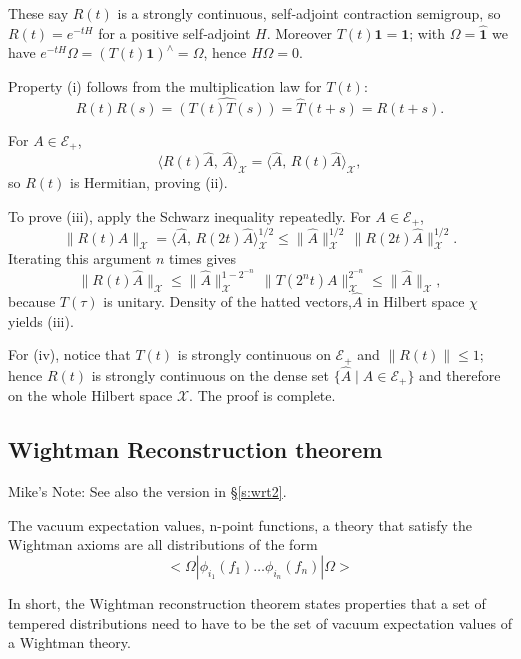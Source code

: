 \documentclass{article}
\newcommand{\1}{\mathbbm{1}}
\theoremstyle{plain}
\theoremstyle{definition}
\numberwithin{equation}{section}
\newcommand\MRD[1]{{\color{red} Mike's Note: #1}}
\begin{document}
These say \(R(t)\) is a strongly continuous, self‑adjoint contraction
semigroup, so \(R(t)=e^{-tH}\) for a positive self‑adjoint \(H\).
Moreover \(T(t)\mathbf1=\mathbf1\); with \(\Omega=\widehat{\mathbf1}\) we have
\(e^{-tH}\Omega=(T(t)\mathbf1)^{\wedge}=\Omega\), hence \(H\Omega=0\).

Property (i) follows from the multiplication law for \(T(t)\):
\[
R(t)R(s)=\hat{(T(t)T(s))}=\hat{T}(t+s)=R(t+s).
\]

For \(A\in\mathcal{E}_{+}\),
\[
\langle R(t)\widehat{A},\,\widehat{A}\rangle_{\mathcal X}
  =\langle\widehat{A},\,R(t)\widehat{A}\rangle_{\mathcal X},
\]
so \(R(t)\) is Hermitian, proving (ii).

To prove (iii), apply the Schwarz inequality repeatedly.  For
\(A\in\mathcal{E}_{+}\),
\[
\|R(t)\widehat{A}\|_{\mathcal X}
  =\bigl\langle\widehat{A},\,R(2t)\widehat{A}\bigr\rangle_{\mathcal X}^{1/2}
  \le\|\widehat{A}\|_{\mathcal X}^{1/2}\,
      \|R(2t)\widehat{A}\|_{\mathcal X}^{1/2}.
\]
Iterating this argument \(n\) times gives
\[
\|R(t)\widehat{A}\|_{\mathcal X}
  \le\|\widehat{A}\|_{\mathcal X}^{1-2^{-n}}\,
      \|T(2^{n}t)A\|_{\mathcal X}^{2^{-n}}
  \le\|\widehat{A}\|_{\mathcal X},
\]
because \(T(\tau)\) is unitary.  Density of the hatted vectors,$\hat{A}$ in Hilbert space $\mathcal{\chi}$ yields (iii).

For (iv), notice that \(T(t)\) is strongly continuous on
\(\mathcal{E}_{+}\) and \(\lVert R(t)\rVert\le1\); hence \(R(t)\) is
strongly continuous on the dense set
\(\{\widehat{A}\mid A\in\mathcal{E}_{+}\}\) and therefore on the whole
Hilbert space \(\mathcal X\).  The proof is complete.






\subsection{Wightman Reconstruction theorem} \label{wightmantheorem}
\label{ss:wrt}

\MRD{See also the version in \S \ref{s:wrt2}.}

The vacuum expectation values, n-point functions, a theory that satisfy the Wightman axioms are all distributions of the form
\begin{equation}
    < \Omega | \phi_{i_1} (f_1) \ldots \phi_{i_n}(f_n) | \Omega> 
\end{equation}

In short, the Wightman reconstruction theorem states properties that a set of tempered distributions need to have to be the set of vacuum expectation values of a Wightman theory. 
\end{document}

